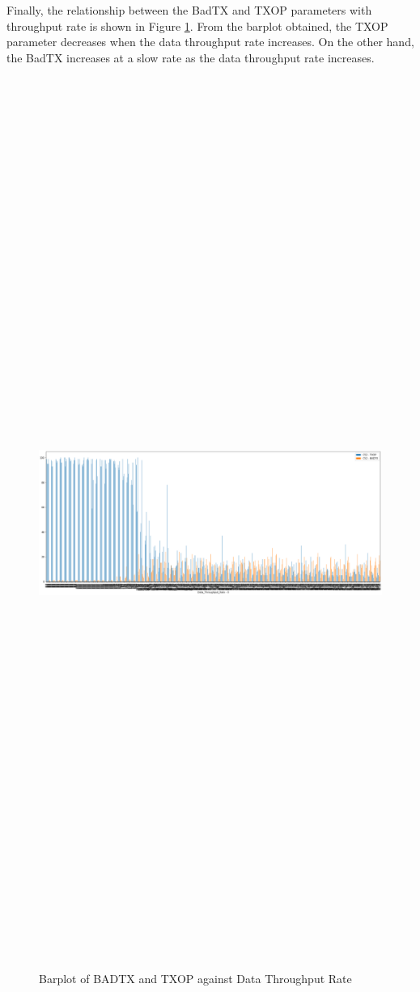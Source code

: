 Finally, the relationship between the BadTX and TXOP parameters with throughput rate is shown in Figure \ref{fig_bp3}. From the barplot obtained, the TXOP parameter decreases when the data throughput rate increases. On the other hand, the BadTX increases at a slow rate as the data throughput rate increases.
\begin{figure} [ht]
    \centering
    \includegraphics[width=14.6cm,height=200.0cm,keepaspectratio]{pages/Chapter4/Chapter 4 Images/Bplot3.PNG}
    \caption{Barplot of BADTX and TXOP against Data Throughput Rate}
    \label{fig_bp3}
\end{figure}

